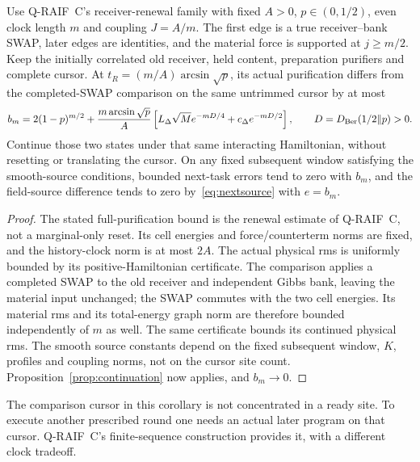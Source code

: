 \begin{corollary}
\label{cor:usable-renewal}
Use Q-RAIF~C's receiver-renewal family with fixed $A>0$,
$p\in(0,1/2)$, even clock length $m$ and coupling $J=A/m$.
The first edge is a true receiver--bank SWAP, later edges are
identities, and the material force is supported at $j\ge m/2$.
Keep the initially correlated old receiver, held content, preparation
purifiers and complete cursor. At
$t_R=(m/A)\arcsin\sqrt p$, its actual purification differs from the
completed-SWAP comparison on the same untrimmed cursor by at most
\[
 b_m=2(1-p)^{m/2}
 +\frac{m\arcsin\sqrt p}{A}
   \left[L_\Delta\sqrt M e^{-mD/4}
                       +c_\Delta e^{-mD/2}\right],
 \qquad D=D_{\rm Ber}(1/2\|p)>0 .
\]
Continue those two states under that same interacting Hamiltonian,
without resetting or translating the cursor. On any fixed subsequent
window satisfying the smooth-source conditions, bounded next-task
errors tend to zero with $b_m$, and the field-source difference tends
to zero by~\eqref{eq:nextsource} with $e=b_m$.
\end{corollary}
\begin{proof}
The stated full-purification bound is the renewal estimate of
Q-RAIF~C, not a marginal-only reset. Its cell energies and
force/counterterm norms are fixed, and the history-clock norm is at
most $2A$. The actual physical rms is uniformly bounded by its
positive-Hamiltonian certificate. The comparison applies a completed
SWAP to the old receiver and independent Gibbs bank, leaving the
material input unchanged; the SWAP commutes with the two cell
energies. Its material rms and its total-energy graph norm are
therefore bounded independently of $m$ as well. The same certificate
bounds its continued physical rms. The smooth source constants depend
on the fixed subsequent window, $K$, profiles and coupling norms,
not on the cursor site count. Proposition~\ref{prop:continuation}
now applies, and $b_m\to0$.
\end{proof}

The comparison cursor in this corollary is not concentrated in a
ready site. To execute another prescribed round one needs an actual
later program on that cursor. Q-RAIF~C's finite-sequence construction
provides it, with a different clock tradeoff.


